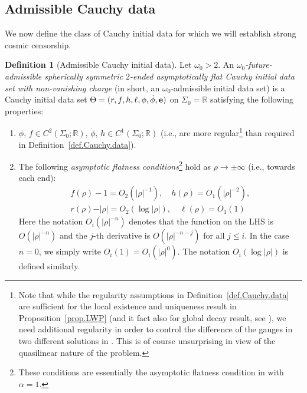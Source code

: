 \documentclass[10pt, reqno]{amsart}
\theoremstyle{definition}
\newtheorem{definition}[theorem]{Definition}
\theoremstyle{remark}
\numberwithin{equation}{section}
\newcommand{\abs}[1]{\vert#1\vert}
\newcommand{\0}{\emptyset}
\newcommand{\alp}{\alpha}
\newcommand{\Sgm}{\Sigma}
\newcommand{\Tht}{\Theta}
\newcommand{\omg}{\omega}
\newcommand{\bfe}{{\bf e}}
\newcommand{\bbR}{\mathbb R}
\newcommand{\e}{\bfe}							%
\begin{document}
\subsection{Admissible Cauchy data}\label{sec.adm.data}
We now define the class of Cauchy initial data for which we will establish strong cosmic censorship.
\begin{definition} [Admissible Cauchy initial data] \label{def:adm-data}
Let $\omg_{0} > 2$. An \emph{$\omg_{0}$-future-admissible spherically symmetric $2$-ended asymptotically flat Cauchy initial data set with non-vanishing charge} (in short, an $\omg_{0}$-admissible initial data set) is a Cauchy initial data set $\Tht = (r, f, h, \ell, \phi, \dot{\phi}, \e)$ on $\Sgm_{0} = \bbR$ satisfying the following properties:
\begin{enumerate}
\item $\phi,\, f \in C^2(\Sigma_0;\mathbb R)$, $\dot{\phi},\, h \in C^1(\Sigma_0;\mathbb R)$ (i.e., are more regular\footnote{Note that while the regularity assumptions in Definition~\ref{def.Cauchy.data} are sufficient for the local existence and uniqueness result in Proposition~\ref{prop.LWP} (and it fact also for global decay result, see \cite{DRPL}), we need additional regularity in order to control the difference of the gauges in two different solutions  in \cite{LO.exterior}. This is of course unsurprising in view of the quasilinear nature of the problem.} than required in Definition~\ref{def.Cauchy.data}).
\item The following \emph{asymptotic flatness conditions}\footnote{These conditions are essentially the asymptotic flatness condition in \cite[Section~A.4]{DRPL} with $\alp = 1$. } hold as $\rho \to \pm\infty$ (i.e., towards each end):
\begin{equation} \label{eq:adm-id-af}
\begin{gathered}
	f(\rho) - 1 = O_{2}(\abs{\rho}^{-1}),\quad
	h(\rho) = O_{1}(\abs{\rho}^{-2}), \\
	r(\rho) - \abs{\rho} = O_{2}(\log \abs{\rho}), \quad
	\ell(\rho) = O_{1}(1)
\end{gathered}
\end{equation}
Here the notation $O_{i}(\abs{\rho}^{-n})$ denotes that the function on the LHS is $O(|\rho|^{-n})$ and the $j$-th derivative is $O(|\rho|^{-n-j})$ for all $j\leq i$. In the case $n = 0$, we simply write $O_{i}(1) = O_{i}(| \rho |^{0})$. The notation $O_{i}(\log \abs{\rho})$ is defined similarly. 


\end{enumerate}
\end{definition}
\end{document}
